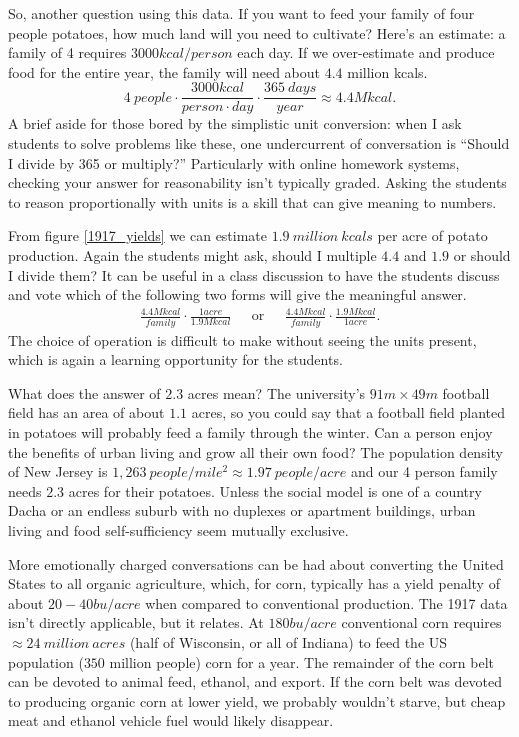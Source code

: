 \documentclass[prb,preprint]{revtex4-2}
\newcommand{\be}{\begin{equation}}
\newcommand{\ee}{\end{equation}}
\newcommand{\bea}{\begin{eqnarray}}
\newcommand{\eea}{\end{eqnarray}}
\begin{document}
So, another question using this data.  If you want to feed your family of four people potatoes, how much land will you need to cultivate?
Here's an estimate: a family of 4 requires $3000kcal/person$ each day.\cite{calorie_age}  If we over-estimate and produce food for the entire year, the family will need about $4.4$ million kcals.
\be
4~people\cdot\frac{3000kcal}{person\cdot day}\cdot\frac{365~days}{year} \approx 4.4 M kcal . 
\ee
A brief aside for those bored by the simplistic unit conversion: when I ask students to solve problems like these, one undercurrent of conversation is ``Should I divide by 365 or multiply?''  Particularly with online homework systems, checking your answer for reasonability isn't  typically graded. Asking the students to reason proportionally with units is a skill that can give meaning to numbers. 

From figure \ref{1917_yields} we can estimate $1.9~million~kcals$ per acre of potato production.  Again the students might ask, should I multiple $4.4$ and $1.9$ or should I divide them?  It can be useful in a class discussion to have the students discuss and vote which of the following two forms will give the meaningful answer.
\bea
\frac{4.4 M kcal}{family}\cdot\frac{1 acre}{1.9M kcal}  & \textrm{~~or~~}&
\frac{4.4 M kcal}{family}\cdot\frac{1.9M kcal}{1 acre} .
\eea
The choice of operation is difficult to make without seeing the units present, which is again a learning opportunity for the students.

What does the answer of $2.3$ acres mean?  The university's $91m\times49m$ football field has an area of about $1.1$ acres, so you could say that a football field planted in potatoes will probably feed a family through the winter.\cite{Deppe}  Can a person enjoy the benefits of urban living and grow all their own food?  The population density of New Jersey is $1,263~people/mile^2 \approx1.97~people/acre$ and our 4 person family needs $2.3$ acres for their potatoes.  
Unless the social model is one of a country Dacha or an endless suburb with no duplexes or apartment buildings, urban living and food self-sufficiency seem mutually exclusive.


More emotionally charged conversations can be had about converting the United States to all organic agriculture, which, for corn, typically has a yield penalty of about $20-40bu/acre$ when compared to conventional production.  The 1917 data isn't directly applicable, but it relates. At $180bu/acre$ conventional corn requires $\approx 24~million~acres$ (half of Wisconsin, or all of Indiana) to feed the US population ($350$ million people) corn for a year.  The remainder of the corn belt can be devoted to animal feed, ethanol, and export.  If the corn belt was devoted to producing organic corn at lower yield,\cite{organic_corn_yield} we probably wouldn't starve, but cheap meat and ethanol vehicle fuel would likely disappear.   
\end{document}
